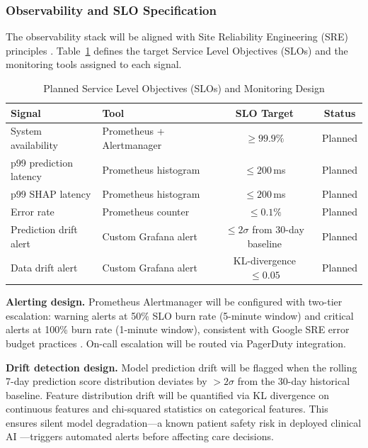 \documentclass[11pt,letterpaper]{article}
\begin{document}
\subsubsection{Observability and SLO Specification}

The observability stack will be aligned with Site Reliability Engineering (SRE) principles \citep{beyer2016site}. Table~\ref{tab:slo} defines the target Service Level Objectives (SLOs) and the monitoring tools assigned to each signal.

\begin{table}[H]
\centering
\caption{Planned Service Level Objectives (SLOs) and Monitoring Design}
\label{tab:slo}
\begin{tabular}{llcc}
\toprule
\textbf{Signal} & \textbf{Tool} & \textbf{SLO Target} & \textbf{Status} \\
\midrule
System availability      & Prometheus + Alertmanager & $\geq 99.9\%$              & Planned \\
p99 prediction latency   & Prometheus histogram       & $\leq 200$\,ms             & Planned \\
p99 SHAP latency         & Prometheus histogram       & $\leq 200$\,ms             & Planned \\
Error rate               & Prometheus counter         & $\leq 0.1\%$               & Planned \\
Prediction drift alert   & Custom Grafana alert       & $\leq 2\sigma$ from 30-day baseline & Planned \\
Data drift alert         & Custom Grafana alert       & KL-divergence $\leq 0.05$  & Planned \\
\bottomrule
\end{tabular}
\end{table}

\textbf{Alerting design.} Prometheus Alertmanager will be configured with two-tier escalation: warning alerts at 50\% SLO burn rate (5-minute window) and critical alerts at 100\% burn rate (1-minute window), consistent with Google SRE error budget practices \citep{beyer2016site}. On-call escalation will be routed via PagerDuty integration.

\textbf{Drift detection design.} Model prediction drift will be flagged when the rolling 7-day prediction score distribution deviates by $>2\sigma$ from the 30-day historical baseline. Feature distribution drift will be quantified via KL divergence on continuous features and chi-squared statistics on categorical features. This ensures silent model degradation---a known patient safety risk in deployed clinical AI \citep{sculley2015hidden}---triggers automated alerts before affecting care decisions.
\end{document}
